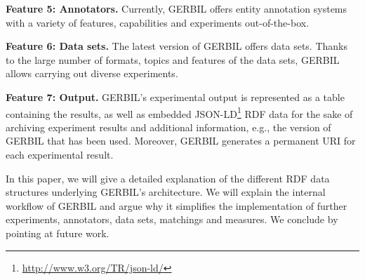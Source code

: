 \textbf{Feature 5: Annotators.}
Currently, GERBIL offers \overallGERBILannotators entity annotation systems with a variety of features, capabilities and experiments out-of-the-box. 

\textbf{Feature 6: Data sets.}
The latest version of GERBIL offers \overalldatasets data sets.
Thanks to the large number of formats, topics and features of the data sets, GERBIL allows carrying out diverse experiments.

\textbf{Feature 7: Output.}
\label{cha334:sec:output}
GERBIL's experimental output is represented as a table containing the results, as well as embedded JSON-LD\footnote{\url{http://www.w3.org/TR/json-ld/}} RDF data for the sake of archiving experiment results and additional information, e.g., the version of GERBIL that has been used.
Moreover, GERBIL generates a permanent URI for each experimental result.


In this paper, we will give a detailed explanation of the different RDF data structures underlying GERBIL's architecture.
We will explain the internal workflow of GERBIL and argue why it simplifies the implementation of further experiments, annotators, data sets, matchings and measures.
We conclude by pointing at future work.



